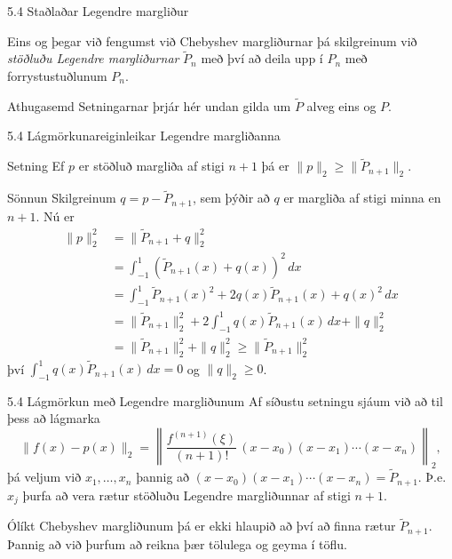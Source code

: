 \begin{frame}{5.4 Staðlaðar Legendre margliður}
 \begin{block}{}
 Eins og þegar við fengumst við Chebyshev margliðurnar þá skilgreinum við 
 \emph{stöðluðu Legendre margliðurnar} $\tilde P_n$ með því að deila upp í $P_n$ með forrystustuðlunum
 $P_n$.
 \end{block}
 \pause
 \begin{block}{Athugasemd}
  Setningarnar þrjár hér undan gilda um $\tilde P$ alveg eins og $P$.
 \end{block}
 \end{frame}
 \begin{frame}{5.4 Lágmörkunareiginleikar Legendre margliðanna}
 \begin{block}{Setning}
 Ef $p$ er stöðluð margliða af stigi $n+1$ þá er $\|p\|_2\geq \|\tilde P_{n+1}\|_2$.
 \end{block}\pause
 \begin{block}{Sönnun}
  Skilgreinum $q = p-\tilde P_{n+1}$, sem þýðir að $q$ er margliða af stigi minna en $n+1$. \pause
  Nú er 
  \begin{align*}
   \|p\|_2^2 &= \|\tilde P_{n+1} + q\|_2^2 \\
   &= \int_{-1}^1 (\tilde P_{n+1}(x) + q(x))^2\, dx \\
   &= \int_{-1}^1 \tilde P_{n+1}(x)^2 + 2q(x)\tilde P_{n+1}(x) + q(x)^2\, dx\\
   &= \|\tilde P_{n+1}\|_2^2 + 2\int_{-1}^1 q(x)\tilde P_{n+1}(x)\, dx + \|q\|_2^2\\
   &= \|\tilde P_{n+1}\|_2^2 +  \|q\|_2^2 \geq \|\tilde P_{n+1}\|_2^2
  \end{align*}
  því $\int_{-1}^1 q(x)\tilde P_{n+1}(x)\, dx=0$ og $\|q\|_2 \geq 0$.
 \end{block}
\end{frame}

 \begin{frame}{5.4 Lágmörkun með Legendre margliðunum}
  Af síðustu setningu sjáum við að til þess að lágmarka 
  $$
      \|f(x)-p(x)\|_2 = \left\|\frac{f^{(n+1)}(\xi)}{(n+1)!}\, (x-x_0)(x-x_1)\cdots (x-x_n) \right\|_2,
  $$
  þá veljum við $x_1,\ldots,x_n$ þannig að 
  $(x-x_0)(x-x_1)\cdots (x-x_n) = \tilde P_{n+1}$. Þ.e.~$x_j$ þurfa að vera rætur 
  stöðluðu Legendre margliðunnar af stigi $n+1$.
  \pause
  
  Ólíkt Chebyshev margliðunum þá er ekki hlaupið að því að finna rætur $\tilde P_{n+1}$.
  Þannig að við þurfum að reikna þær tölulega og geyma í töflu.
  \end{frame}
  

